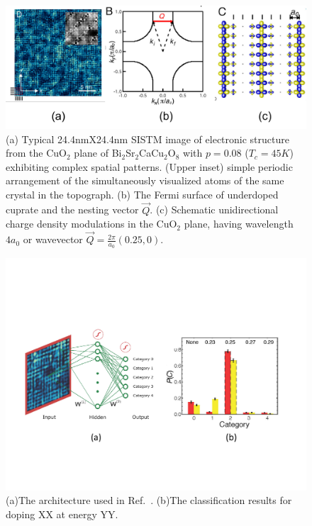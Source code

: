 \documentclass[aps,prb,floatfix,amsmath,amssymb,amsfonts,10pt,floatfix,longbibliography]{revtex4-1}
\begin{document}
\begin{enumerate}
\begin{figure}[t]
\includegraphics[width=\linewidth]{Figures/STM-problem.png} 
\caption{(a) Typical 24.4nmX24.4nm SISTM image of electronic structure  from the CuO$_2$ plane of Bi$_2$Sr$_2$CaCu$_2$O$_8$ with $p=0.08$ ($T_c=45K$) exhibiting complex spatial patterns. 
(Upper inset) simple periodic arrangement of the simultaneously visualized atoms of the same crystal in the topograph. 
(b) The Fermi surface of underdoped cuprate and the nesting vector $\vec{Q}$. (c) Schematic unidirectional charge density modulations in the CuO$_2$ plane, having wavelength $4a_0$ or wavevector $\vec{Q}=\frac{2\pi}{a_0}(0.25,0)$.\cite{Zhang2018}}
\label{fig:STM-problem}
\end{figure}

\begin{figure}[t]
\includegraphics[width=\linewidth]{Manuscript/Figures/STM-results.pdf} 
\caption{(a)The architecture used in Ref.~\cite{Zhang2018}. (b)The classification results for doping XX at energy YY.}
\label{fig:STM-results}
\end{figure}


\end{enumerate}
\end{document}

